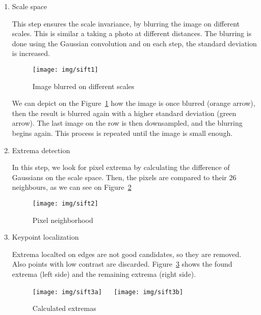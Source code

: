\documentclass{scrartcl}
\newcommand{\rulesep}{\unskip\ \vrule\ }
\begin{document}
\begin{enumerate}
    \item Scale space

        This step ensures the scale invariance, by blurring the image on different scales. This is similar a taking a photo at different distances. The blurring is done using the Gaussian convolution and on each step, the standard deviation is increased.

        \begin{figure}[H]
            \centering
            \texttt{[image: img/sift1]}
            \caption{Image blurred on different scales}%
            \label{fig:sift1}
        \end{figure}

        We can depict on the Figure~\ref{fig:sift1} how the image is once blurred (orange arrow), then the result is blurred again with a higher standard deviation (green arrow). The last image on the row is then downsampled, and the blurring begins again. This process is repeated until the image is small enough.

    \item Extrema detection

        In this step, we look for pixel extrema by calculating the difference of Gaussians on the scale space. Then, the pixels are compared to their 26 neighbours, as we can see on Figure~\ref{fig:sift2}

        \begin{figure}[H]
            \centering
            \texttt{[image: img/sift2]}
            \caption{Pixel neighborhood}%
            \label{fig:sift2}
        \end{figure}

    \item Keypoint localization

        Extrema localted on edges are not good candidates, so they are removed. Also points with low contrast are discarded. Figure~\ref{fig:sift3} shows the found extrema (left side) and the remaining extrema (right side).

        \begin{figure}[H]
            \centering
            \texttt{[image: img/sift3a]}
            \rulesep
            \texttt{[image: img/sift3b]}
            \caption{Calculated extremas}%
            \label{fig:sift3}
        \end{figure}


\end{enumerate}
\end{document}
